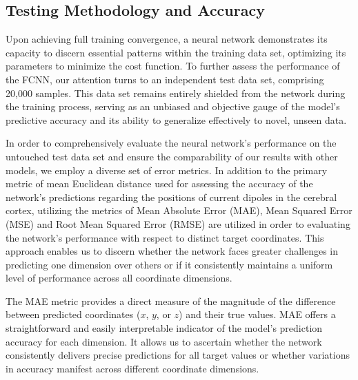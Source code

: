 \documentclass[a4paper, UKenglish, 11pt]{uiomaster}
\begin{document}
\subsection{Testing Methodology and Accuracy}
Upon achieving full training convergence, a neural network demonstrates its capacity to discern essential patterns within the training data set, optimizing its parameters to minimize the cost function. To further assess the performance of the FCNN, our attention turns to an independent test data set, comprising 20,000 samples. This data set remains entirely shielded from the network during the training process, serving as an unbiased and objective gauge of the model's predictive accuracy and its ability to generalize effectively to novel, unseen data.

In order to comprehensively evaluate the neural network's performance on the untouched test data set and ensure the comparability of our results with other models, we employ a diverse set of error metrics. In addition to the primary metric of mean Euclidean distance used for assessing the accuracy of the network's predictions regarding the positions of current dipoles in the cerebral cortex, utilizing the metrics of Mean Absolute Error (MAE), Mean Squared Error (MSE) and Root Mean Squared Error (RMSE) are utilized in order to evaluating the network's performance with respect to distinct target coordinates. This approach enables us to discern whether the network faces greater challenges in predicting one dimension over others or if it consistently maintains a uniform level of performance across all coordinate dimensions.

The MAE metric provides a direct measure of the magnitude of the difference between predicted coordinates ($x$, $y$, or $z$) and their true values. MAE offers a straightforward and easily interpretable indicator of the model's prediction accuracy for each dimension. It allows us to ascertain whether the network consistently delivers precise predictions for all target values or whether variations in accuracy manifest across different coordinate dimensions.
\end{document}
